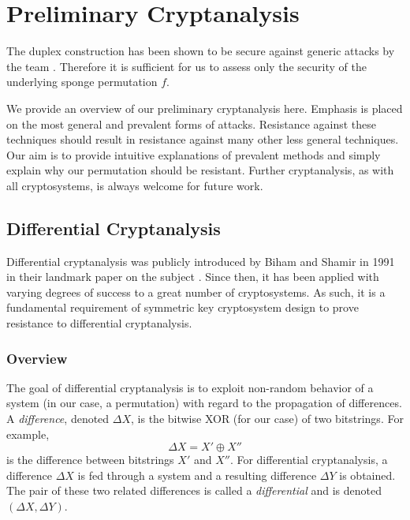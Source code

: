\section{Preliminary Cryptanalysis}
\label{sec:Cryptanalysis}
The duplex construction has been shown to be secure against generic attacks by the \Keccak team \cite{Bertoni2011_SpongeFunctions}.
Therefore it is sufficient for us to assess only the security of the underlying sponge permutation $f$.

We provide an overview of our preliminary cryptanalysis here.
Emphasis is placed on the most general and prevalent forms of attacks.
Resistance against these techniques should result in resistance against many other less general techniques.
Our aim is to provide intuitive explanations of prevalent methods and simply explain why our permutation should be resistant.
Further cryptanalysis, as with all cryptosystems, is always welcome for future work.

\subsection{Differential Cryptanalysis}
Differential cryptanalysis was publicly introduced by Biham and Shamir in 1991 in their landmark paper on the subject \cite{Biham1991_Differential}.
Since then, it has been applied with varying degrees of success to a great number of cryptosystems.
As such, it is a fundamental requirement of symmetric key cryptosystem design to prove resistance to differential cryptanalysis.

\subsubsection{Overview}
The goal of differential cryptanalysis is to exploit non-random behavior of a system (in our case, a permutation) with regard to the propagation of differences.
A \emph{difference}, denoted $\Delta X$, is the bitwise XOR (for our case) of two bitstrings. For example,
\begin{equation*}
\Delta X = X' \oplus X''
\end{equation*}
is the difference between bitstrings $X'$ and $X''$.
For differential cryptanalysis, a difference $\Delta X$ is fed through a system and a resulting difference $\Delta Y$ is obtained.
The pair of these two related differences is called a \emph{differential} and is denoted $(\Delta X,\Delta Y)$.

